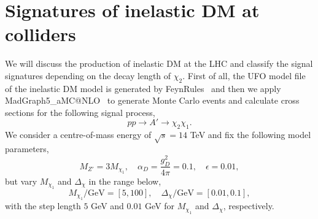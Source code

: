 \documentclass[preprint, superscriptaddress,amsmath, nofootinbib]{revtex4-1}
\begin{document}




\section{Signatures of inelastic DM at colliders}
\label{sec:signature}

We will discuss the production of inelastic DM at the LHC and classify the signal signatures depending on the decay length of $\chi_2$. First of all, the UFO model file of the inelastic DM model is generated by \textsf{FeynRules}~\cite{Christensen:2008py} and then we apply \textsf{MadGraph5\_aMC@NLO}~\cite{Alwall:2014hca} to generate Monte Carlo events and calculate cross sections for the following signal process, 
\begin{equation}
    pp \rightarrow A'\rightarrow \chi_2\chi_1.
\end{equation}
We consider a centre-of-mass energy of $\sqrt{s}=14$ TeV and fix the following model parameters, 
\begin{equation} 
    M_{Z'} = 3 M_{\chi_1},\quad \alpha_D = \frac{g_D^2}{4\pi} = 0.1,\quad \epsilon = 0.01,
\end{equation}
but vary $M_{\chi_1}$ and $\Delta_{\chi}$ in the range below, 
\begin{equation} 
    M_{\chi_1}/\text{GeV} = \left[ 5, 100\right],\quad \Delta_{\chi}/\text{GeV} = \left[ 0.01, 0.1\right], 
\end{equation} 
with the step length $5$ GeV and $0.01$ GeV for $M_{\chi_1}$ and $\Delta_{\chi}$, respectively.
\end{document}
